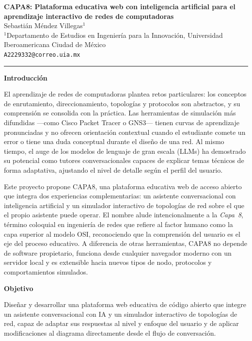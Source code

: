 \documentclass[12pt,letterpaper]{article}
\begin{document}
\begin{center}
\textbf{CAPA8: Plataforma educativa web con inteligencia artificial para el aprendizaje interactivo de redes de computadoras}\\[2pt]
Sebastián Méndez Villegas$^{1}$\\[1pt]
$^{1}$Departamento de Estudios en Ingeniería para la Innovación, Universidad Iberoamericana Ciudad de México\\[1pt]
\texttt{A2229332@correo.uia.mx}
\end{center}

\begin{center}\rule{0.55\textwidth}{0.4pt}\end{center}

\textbf{Introducción}

El aprendizaje de redes de computadoras plantea retos particulares: los conceptos de enrutamiento, direccionamiento, topologías y protocolos son abstractos, y su comprensión se consolida con la práctica. Las herramientas de simulación más difundidas —como Cisco Packet Tracer o GNS3— tienen curvas de aprendizaje pronunciadas y no ofrecen orientación contextual cuando el estudiante comete un error o tiene una duda conceptual durante el diseño de una red. Al mismo tiempo, el auge de los modelos de lenguaje de gran escala (LLMs) ha demostrado su potencial como tutores conversacionales capaces de explicar temas técnicos de forma adaptativa, ajustando el nivel de detalle según el perfil del usuario.

Este proyecto propone CAPA8, una plataforma educativa web de acceso abierto que integra dos experiencias complementarias: un asistente conversacional con inteligencia artificial y un simulador interactivo de topologías de red sobre el que el propio asistente puede operar. El nombre alude intencionalmente a la \textit{Capa~8}, término coloquial en ingeniería de redes que refiere al factor humano como la capa superior al modelo OSI, reconociendo que la comprensión del usuario es el eje del proceso educativo. A diferencia de otras herramientas, CAPA8 no depende de software propietario, funciona desde cualquier navegador moderno con un servidor local y es extensible hacia nuevos tipos de nodo, protocolos y comportamientos simulados.

\textbf{Objetivo}

Diseñar y desarrollar una plataforma web educativa de código abierto que integre un asistente conversacional con IA y un simulador interactivo de topologías de red, capaz de adaptar sus respuestas al nivel y enfoque del usuario y de aplicar modificaciones al diagrama directamente desde el flujo de conversación.
\end{document}
